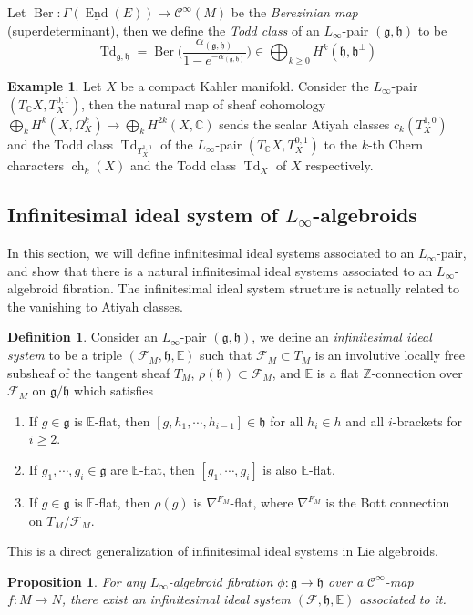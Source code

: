\documentclass[12pt]{amsart}
\newtheorem{prop}[thm]{Proposition}
\theoremstyle{definition}
\newtheorem{example}[thm]{Example}
\newtheorem{defn}[thm]{Definition}
\theoremstyle{remark}
\numberwithin{equation}{section}
\newcommand{\CF}{{\mathcal F}}
\newcommand{\cinf}{{\mathcal C}^{\infty}}
\newcommand{\Z}{{\mathbb{Z}}}
\newcommand{\C}{{\mathbb{C}}}
\newcommand{\1}{{\mathbb{1}}}
\newcommand{\g}{\mathfrak{g}}
\newcommand{\h}{\mathfrak{h}}
\newcommand{\End}{\operatorname{End}}
\newcommand{\ber}{\operatorname{Ber}}
\newcommand{\td}{\operatorname{Td}}
\newcommand{\ch}{\operatorname{ch}}
\begin{document}
Let $\ber: \Gamma(\underline{\End}(E)) \to \cinf(M)$ be the {\it Berezinian map} (superdeterminant), then we define the {\it Todd class} of an $L_{\infty}$-pair $(\g, \h)$ to be 
\begin{equation*}
    \td_{\g, \h} = \ber\Bigg(\frac{\alpha_{(\g, \h)}}{1 - e^{-\alpha_{(\g, \h)}}} \Bigg) \in \bigoplus_{k\ge 0} H^{k}(\h, \h^{\perp})
\end{equation*}
\begin{example}
    Let $X$ be a compact Kahler manifold. Consider the $L_{\infty}$-pair $(T_{\C}X, T^{0,1}_X)$, then the natural map of sheaf cohomology $\bigoplus_k H^k(X, \Omega_X^k) \to \bigoplus_k H^{2k} (X, \C)$ sends the scalar Atiyah classes $c_k(T_X^{1,0})$ and the Todd class $\td_{T_X^{1,0}}$ of the $L_{\infty}$-pair $(T_{\C}X, T^{0,1}_X)$ to the $k$-th Chern characters $\ch_k(X)$ and the Todd class $\td_X$ of $X$ respectively.
\end{example}


\subsection{Infinitesimal ideal system of $L_{\infty}$-algebroids}

In this section, we will define infinitesimal ideal systems associated to an $L_{\infty}$-pair, and show that there is a natural infinitesimal ideal systems associated to an $L_{\infty}$-algebroid fibration. The infinitesimal ideal system structure is actually related to the vanishing to Atiyah classes.

\begin{defn}
Consider an $L_{\infty}$-pair $(\g, \h)$, we define an {\it infinitesimal ideal system} to be a triple $(\CF_M, \h, \mathbb{E})$ such that $\CF_M \subset T_M$ is an involutive locally free subsheaf of the tangent sheaf $T_M$, $\rho(\h) \subset \CF_M$, and $\mathbb{E}$ is a flat $\Z$-connection over $\CF_M$ on $\g/\h$ which satisfies
\begin{enumerate}
    \item If $g\in \g$ is $\mathbb{E}$-flat, then $[g, h_1,\cdots, h_{i-1}] \in \h$ for all $h_i \in h$ and all $i$-brackets for $i\ge 2$.
    \item If $g_1, \cdots, g_i \in \g$ are $\mathbb{E}$-flat, then $[g_1, \cdots, g_i]$ is also $\mathbb{E}$-flat.
    \item If $g\in \g$ is $\mathbb{E}$-flat, then $\rho(g)$ is $\nabla^{F_M}$-flat, where
    $\nabla^{F_M}$ is the Bott connection on $T_M/\CF_M$.
\end{enumerate}
\end{defn}
This is a direct generalization of infinitesimal ideal systems in Lie algebroids.
\begin{prop}
 For any $L_{\infty}$-algebroid fibration $\phi:\g \to \h$ over a $\cinf$-map $f:M \to N$, there exist an infinitesimal ideal system $(\CF, \h, \mathbb{E})$ associated to it.
\end{prop}
\end{document}

